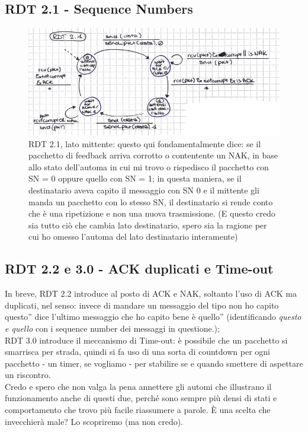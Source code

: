 \subsection*{RDT 2.1 - Sequence Numbers}
\begin{figure} [h]
    \centering
    \includegraphics[width=0.7\linewidth]{Figures/03/rdt2-1-s.png}
    \caption{RDT 2.1, lato mittente: questo qui fondamentalmente dice: se il pacchetto di feedback arriva corrotto o contentente un NAK, in base allo stato dell'automa in cui mi trovo o rispedisco il pacchetto con SN = 0 oppure quello con SN = 1; in questa maniera, se il destinatario aveva capito il messaggio con SN 0 e il mittente gli manda un pacchetto con lo stesso SN, il destinatario si rende conto che è una ripetizione e non una nuova trasmissione. (E questo credo sia tutto ciò che cambia lato destinatario, spero sia la ragione per cui ho omesso l'automa del lato destinatario interamente)}
    \label{fig:rdt-21s}
\end{figure}

\newpage
{}
\subsection*{RDT 2.2 e 3.0 - ACK duplicati e Time-out}
\noindent In breve, RDT 2.2 introduce al posto di ACK e NAK, soltanto l'uso di ACK ma duplicati, nel senso: invece di mandare un messaggio del tipo \openapex non ho capito questo'' dice \openapex l'ultimo messaggio che ho capito bene è quello'' (identificando \textit{questo e quello} con i sequence number dei messaggi in questione.);\\
\noindent RDT 3.0 introduce il meccanismo di Time-out: è possibile che un pacchetto si smarrisca per strada, quindi si fa uso di una sorta di countdown per ogni pacchetto - un timer, se vogliamo - per stabilire se e quando smettere di aspettare un riscontro.\\
\noindent Credo e spero che non valga la pena annettere gli automi che illustrano il funzionamento anche di questi due, perché sono sempre più densi di stati e comportamento che trovo più facile riassumere a parole. È una scelta che invecchierà male? Lo scopriremo (ma non credo).\\

